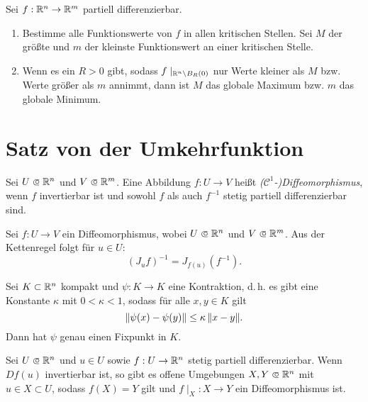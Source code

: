 \documentclass{cheat-sheet}
\begin{document}
\begin{samepage}

\begin{strat}
Sei $f : \mathbb{R}^n \to \mathbb{R}^m$ partiell differenzierbar.
\begin{enumerate}
  \item Bestimme alle Funktionswerte von $f$ in allen kritischen Stellen. Sei $M$ der größte und $m$ der kleinste Funktionswert an einer kritischen Stelle.
  \item Wenn es ein $R > 0$ gibt, sodass $f\mid_{\mathbb{R}^n \backslash B_R(0)}$ nur Werte kleiner als $M$ bzw. Werte größer als $m$ annimmt, dann ist $M$ das globale Maximum bzw. $m$ das globale Minimum.
\end{enumerate}
\end{strat}


\section{Satz von der Umkehrfunktion}

\end{samepage}

\begin{defn}
Sei $U \opn \R^n$ und $V \opn \R^m$. Eine Abbildung $f : U \to V$ heißt \emph{($\mathcal{C}^1$-)Diffeomorphismus}, wenn $f$ invertierbar ist und sowohl $f$ als auch $f^{-1}$ stetig partiell differenzierbar sind.
\end{defn}

\begin{bem}
Sei $f : U \to V$ ein Diffeomorphismus, wobei $U \opn \R^n$ und $V \opn \R^m$. Aus der Kettenregel folgt für $u \in U$:
\[ (J_u f)^{-1} = J_{f(u)}(f^{-1}). \]
\end{bem}

\begin{satz}
Sei $K \subset \mathbb{R}^n$ kompakt und $\psi : K \to K$ eine Kontraktion, d.\,h. es gibt eine Konstante $\kappa$ mit $0 < \kappa < 1$, sodass für alle $x, y \in K$ gilt
\[ \lVert\psi(x) - \psi(y)\rVert \le \kappa\, \lVert x - y\rVert. \]
Dann hat $\psi$ genau einen Fixpunkt in $K$.
\end{satz}

\begin{satz}
Sei $U \opn \R^n$ und $u \in U$ sowie $f : U \to \mathbb{R}^n$ stetig partiell differenzierbar. Wenn $D f(u)$ invertierbar ist, so gibt es offene Umgebungen $X, Y \opn \R^n$ mit $u \in X \subset U$, sodass $f(X) = Y$ gilt und $f\mid_X : X \to Y$ ein Diffeomorphismus ist.
\end{satz}
\end{document}
